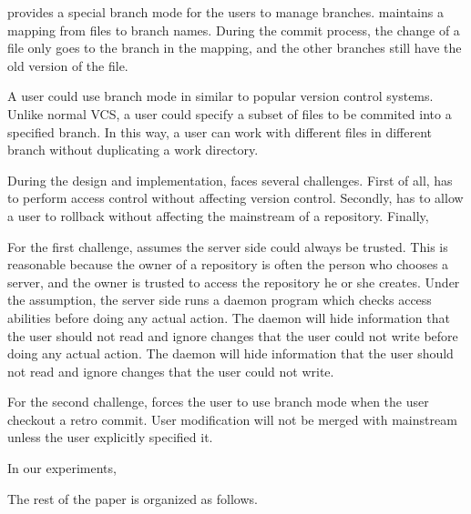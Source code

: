 \sys provides a special branch mode for the users to manage branches. \Sys
maintains a mapping from files to branch names. During the commit process, the
change of a file only goes to the branch in the mapping, and the other branches
still have the old version of the file.

A user could use branch mode in \sys similar to popular version control systems.
Unlike normal VCS, a user could specify a subset of files to be commited into a
specified branch. In this way, a user can work with different files in different
branch without duplicating a work directory. 

During the design and implementation, \sys faces several challenges. First of
all, \sys has to perform access control without affecting version control.
Secondly, \sys has to allow a user to rollback without affecting the mainstream
of a repository. Finally, 

For the first challenge, \sys assumes the server side could always be trusted.
This is reasonable because the owner of a repository is often the person who
chooses a server, and the owner is trusted to access the repository he or she creates.
Under the assumption, the server side runs a daemon program which checks access abilities before
doing any actual action. The daemon will hide information that the user should
not read and ignore changes that the user could not write before doing
any actual action. The daemon will hide information that the user should not
read and ignore changes that the user could not write.

For the second challenge, \sys forces the user to use branch mode when the user
checkout a retro commit. User modification
will not be merged with mainstream unless the user explicitly
specified it.


In our experiments, 


The rest of the paper is organized as follows. 

